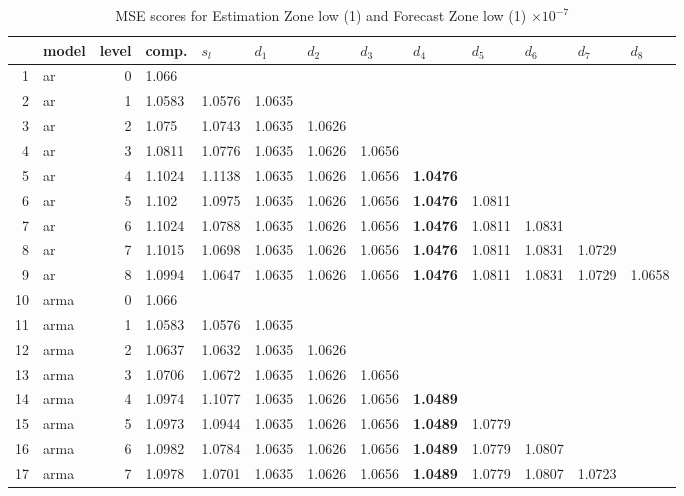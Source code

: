 \documentclass[10pt,a4paper]{article}
\begin{document}
\begin{table}[ht]
\centering
\caption{MSE scores for Estimation Zone low (1) and Forecast Zone low (1) $ \times 10^{-7}$} 
\begin{tabular}{rlrllllllllll}
  \hline
 & model & level & comp. & $s_l$ & $d_1$ & $d_2$ & $d_3$ & $d_4$ & $d_5$ & $d_6$ & $d_7$ & $d_8$ \\ 
  \hline
1 & ar &     0 & 1.066 &  &  &  &  &  &  &  &  &  \\ 
  2 & ar &     1 & 1.0583 & 1.0576 & 1.0635 &  &  &  &  &  &  &  \\ 
  3 & ar &     2 & 1.075 & 1.0743 & 1.0635 & 1.0626 &  &  &  &  &  &  \\ 
  4 & ar &     3 & 1.0811 & 1.0776 & 1.0635 & 1.0626 & 1.0656 &  &  &  &  &  \\ 
  5 & ar &     4 & 1.1024 & 1.1138 & 1.0635 & 1.0626 & 1.0656 & \textbf{1.0476} &  &  &  &  \\ 
  6 & ar &     5 & 1.102 & 1.0975 & 1.0635 & 1.0626 & 1.0656 & \textbf{1.0476} & 1.0811 &  &  &  \\ 
  7 & ar &     6 & 1.1024 & 1.0788 & 1.0635 & 1.0626 & 1.0656 & \textbf{1.0476} & 1.0811 & 1.0831 &  &  \\ 
  8 & ar &     7 & 1.1015 & 1.0698 & 1.0635 & 1.0626 & 1.0656 & \textbf{1.0476} & 1.0811 & 1.0831 & 1.0729 &  \\ 
  9 & ar &     8 & 1.0994 & 1.0647 & 1.0635 & 1.0626 & 1.0656 & \textbf{1.0476} & 1.0811 & 1.0831 & 1.0729 & 1.0658 \\ 
   \hline
10 & arma &     0 & 1.066 &  &  &  &  &  &  &  &  &  \\ 
  11 & arma &     1 & 1.0583 & 1.0576 & 1.0635 &  &  &  &  &  &  &  \\ 
  12 & arma &     2 & 1.0637 & 1.0632 & 1.0635 & 1.0626 &  &  &  &  &  &  \\ 
  13 & arma &     3 & 1.0706 & 1.0672 & 1.0635 & 1.0626 & 1.0656 &  &  &  &  &  \\ 
  14 & arma &     4 & 1.0974 & 1.1077 & 1.0635 & 1.0626 & 1.0656 & \textbf{1.0489} &  &  &  &  \\ 
  15 & arma &     5 & 1.0973 & 1.0944 & 1.0635 & 1.0626 & 1.0656 & \textbf{1.0489} & 1.0779 &  &  &  \\ 
  16 & arma &     6 & 1.0982 & 1.0784 & 1.0635 & 1.0626 & 1.0656 & \textbf{1.0489} & 1.0779 & 1.0807 &  &  \\ 
  17 & arma &     7 & 1.0978 & 1.0701 & 1.0635 & 1.0626 & 1.0656 & \textbf{1.0489} & 1.0779 & 1.0807 & 1.0723 &  \\ 

\end{tabular}
\end{table}
\end{document}
